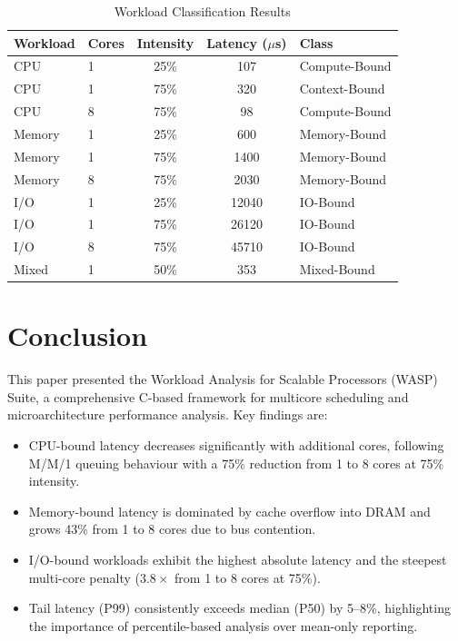 \documentclass[conference]{IEEEtran}
\begin{document}
\begin{table}[htbp]
\caption{Workload Classification Results}
\label{tab:classification}
\begin{center}
\begin{tabular}{llccl}
\toprule
\textbf{Workload} & \textbf{Cores} & \textbf{Intensity} & \textbf{Latency ($\mu$s)} & \textbf{Class} \\
\midrule
CPU    & 1 & 25\% &  107 & Compute-Bound \\
CPU    & 1 & 75\% &  320 & Context-Bound \\
CPU    & 8 & 75\% &   98 & Compute-Bound \\
Memory & 1 & 25\% &  600 & Memory-Bound  \\
Memory & 1 & 75\% & 1400 & Memory-Bound  \\
Memory & 8 & 75\% & 2030 & Memory-Bound  \\
I/O    & 1 & 25\% & 12040 & IO-Bound     \\
I/O    & 1 & 75\% & 26120 & IO-Bound     \\
I/O    & 8 & 75\% & 45710 & IO-Bound     \\
Mixed  & 1 & 50\% &  353 & Mixed-Bound   \\
\bottomrule
\end{tabular}
\end{center}
\end{table}

\section{Conclusion}
\label{sec:conclusion}

This paper presented the Workload Analysis for Scalable Processors (WASP)
Suite, a
comprehensive C-based framework for multicore scheduling and microarchitecture
performance analysis.  Key findings are:

\begin{itemize}
  \item CPU-bound latency decreases significantly with additional cores,
        following M/M/1 queuing behaviour with a 75\% reduction from 1 to 8
        cores at 75\% intensity.
  \item Memory-bound latency is dominated by cache overflow into DRAM and
        grows 43\% from 1 to 8 cores due to bus contention.
  \item I/O-bound workloads exhibit the highest absolute latency and the
        steepest multi-core penalty ($3.8\times$ from 1 to 8 cores at 75\%).
  \item Tail latency (P99) consistently exceeds median (P50) by 5--8\%,
        highlighting the importance of percentile-based analysis over
        mean-only reporting.
\end{itemize}
\end{document}
